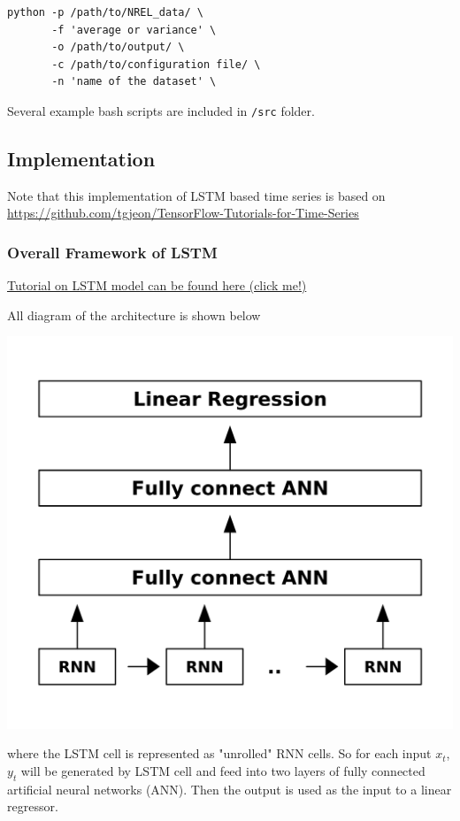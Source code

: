 \documentclass[11pt]{article}
\begin{document}
\begin{verbatim}
python -p /path/to/NREL_data/ \
       -f 'average or variance' \
       -o /path/to/output/ \
       -c /path/to/configuration file/ \
       -n 'name of the dataset' \
\end{verbatim}

Several example bash scripts are included in \texttt{/src} folder.

\subsection{Implementation}
\label{sec-3-2}
Note that this implementation of LSTM based time series is based on
\url{https://github.com/tgjeon/TensorFlow-Tutorials-for-Time-Series}

\subsubsection{Overall Framework of LSTM}
\label{sec-3-2-1}
\href{http://colah.github.io/posts/2015-08-Understanding-LSTMs/}{Tutorial on LSTM model can be found here (click me!)}

All diagram of the architecture is shown below

\includegraphics[width=.9\linewidth]{LSTM-Structure.png}

where the LSTM cell is represented as "unrolled" RNN cells. So for
each input \(x_t\), \(y_t\) will be generated by LSTM cell and feed
into two layers of fully connected artificial neural networks
(ANN). Then the output is used as the input to a linear regressor.
\end{document}
